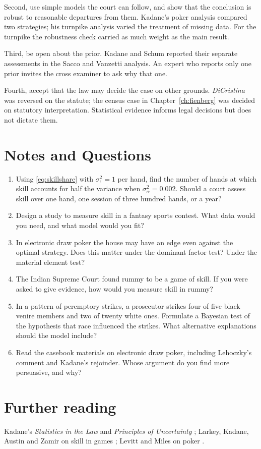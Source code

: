 Second, use simple models the court can follow, and show that the conclusion is robust to reasonable departures from them. Kadane's poker analysis compared two strategies; his turnpike analysis varied the treatment of missing data. For the turnpike the robustness check carried as much weight as the main result.

Third, be open about the prior. Kadane and Schum reported their separate assessments in the Sacco and Vanzetti analysis. An expert who reports only one prior invites the cross examiner to ask why that one.

Fourth, accept that the law may decide the case on other grounds. \emph{DiCristina} was reversed on the statute; the census case in Chapter~\ref{ch:fienberg} was decided on statutory interpretation. Statistical evidence informs legal decisions but does not dictate them.

\section*{Notes and Questions}
\begin{enumerate}[label=\arabic*.]
\item Using \eqref{eq:skillshare} with $\sigma_\epsilon^2 = 1$ per hand, find the number of hands at which skill accounts for half the variance when $\sigma_\alpha^2 = 0.002$. Should a court assess skill over one hand, one session of three hundred hands, or a year?
\item Design a study to measure skill in a fantasy sports contest. What data would you need, and what model would you fit?
\item In electronic draw poker the house may have an edge even against the optimal strategy. Does this matter under the dominant factor test? Under the material element test?
\item The Indian Supreme Court found rummy to be a game of skill. If you were asked to give evidence, how would you measure skill in rummy?
\item In a pattern of peremptory strikes, a prosecutor strikes four of five black venire members and two of twenty white ones. Formulate a Bayesian test of the hypothesis that race influenced the strikes. What alternative explanations should the model include?
\item Read the casebook materials on electronic draw poker, including Lehoczky's comment and Kadane's rejoinder. Whose argument do you find more persuasive, and why?
\end{enumerate}

\section*{Further reading}
Kadane's \emph{Statistics in the Law} \citep{kadane2008} and \emph{Principles of Uncertainty} \citep{kadane2011}; Larkey, Kadane, Austin and Zamir on skill in games \citep{larkey1997}; Levitt and Miles on poker \citep{levitt2014}.
